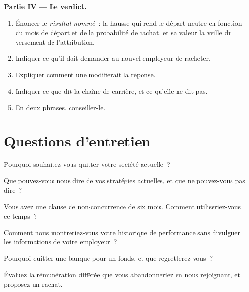 \begin{problem}
\medskip\noindent\textbf{Partie IV --- Le verdict.}
\begin{enumerate}[resume]
\item Énoncer le \emph{résultat nommé}~: la hausse qui rend le départ neutre en fonction du mois de départ et de la
probabilité de rachat, et sa valeur la veille du versement de l'attribution.
\item Indiquer ce qu'il doit demander au nouvel employeur de racheter.
\item Expliquer comment une  modifierait la réponse.
\item Indiquer ce que dit la chaîne de carrière, et ce qu'elle ne dit pas.
\item En deux phrases, conseiller-le.
\end{enumerate}
\end{problem}

\section{Questions d'entretien}

\begin{interviewq}\label{iq:in:career-paths-and-moves:1}
Pourquoi souhaitez-vous quitter votre société actuelle~?
\end{interviewq}

\begin{interviewq}\label{iq:in:career-paths-and-moves:2}
Que pouvez-vous nous dire de vos stratégies actuelles, et que ne pouvez-vous pas dire~?
\end{interviewq}

\begin{interviewq}\label{iq:in:career-paths-and-moves:3}
Vous avez une clause de non-concurrence de six mois. Comment utiliseriez-vous ce temps~?
\end{interviewq}

\begin{interviewq}\label{iq:in:career-paths-and-moves:4}
Comment nous montreriez-vous votre historique de performance sans divulguer les informations de votre employeur~?
\end{interviewq}

\begin{interviewq}\label{iq:in:career-paths-and-moves:5}
Pourquoi quitter une banque pour un fonds, et que regretterez-vous~?
\end{interviewq}

\begin{interviewq}\label{iq:in:career-paths-and-moves:6}
Évaluez la rémunération différée que vous abandonneriez en nous rejoignant, et proposez un rachat.
\end{interviewq}
